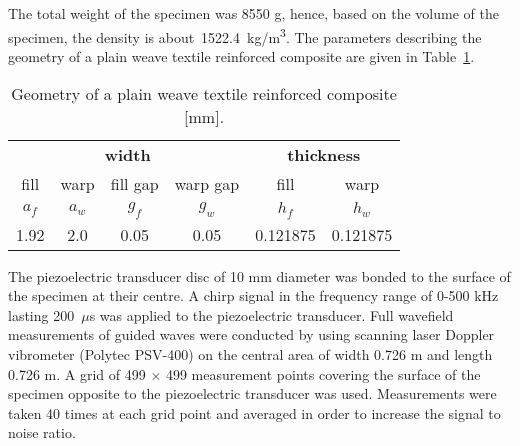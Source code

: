 \documentclass[preprint,12pt]{elsarticle}
\begin{document}
The total weight of the specimen was 8550 g, hence, based on the volume of the 
specimen, the density is 
about~1522.4~kg/m\textsuperscript{3}.
The parameters describing the geometry of a plain weave textile reinforced composite 
are given in 
Table~\ref{tab:weave_geo}. 
 \begin{table}[h]
	\renewcommand{\arraystretch}{1.3}
	\centering \footnotesize
	\caption{Geometry of a plain weave textile reinforced composite [mm].}
	\begin{tabular}{cccccc} 
		\toprule
		\multicolumn{4}{c}{\textbf{width} }	& \multicolumn{2}{c}{\textbf{thickness} }  \\ 
	    \cmidrule(lr){1-4} \cmidrule(lr){5-6} 
		fill & warp & fill gap& warp gap& fill & warp\\
		\(a_f\) &\(a_w\)& \(g_f\)  & \(g_w\)  & \(h_f\)& \(h_w\) \\ 
		\cmidrule(lr){1-2} \cmidrule(lr){3-4} \cmidrule(lr){5-6}
		1.92 &2.0& 0.05& 0.05 & 0.121875 & 0.121875 \\
		\bottomrule 
	\end{tabular} 
	\label{tab:weave_geo}
\end{table}

The piezoelectric transducer disc of 10 mm diameter  was bonded to the surface of the 
specimen at their centre. A chirp signal in the frequency range of 0-500 kHz lasting 
200~\(\mu\)s was applied to the piezoelectric transducer. Full wavefield measurements 
of guided waves were conducted by using scanning laser Doppler vibrometer (Polytec 
PSV-400) on the central area of width 0.726 m and length 0.726 m. A grid of 499 
\(\times\) 499 measurement points covering the surface of the specimen opposite to 
the 
piezoelectric transducer was used. Measurements were taken 40 times at each grid 
point and averaged in order to increase the signal to noise ratio.
\end{document}
